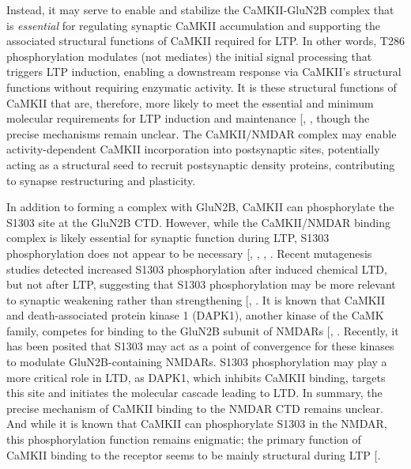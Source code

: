 \documentclass[
  11pt,
  letterpaper,
]{scrreprt}
\begin{document}
Instead, it may serve to enable and stabilize the CaMKII-GluN2B complex
that is \emph{essential} for regulating synaptic CaMKII accumulation and
supporting the associated structural functions of CaMKII required for
LTP. In other words, T286 phosphorylation modulates (not mediates) the
initial signal processing that triggers LTP induction, enabling a
downstream response via CaMKII's structural functions without requiring
enzymatic activity. It is these structural functions of CaMKII that are,
therefore, more likely to meet the essential and minimum molecular
requirements for LTP induction and maintenance
{[},
\citeproc{ref-kim2016Interplay}{220}{]}, though the precise mechanisms
remain unclear. The CaMKII/NMDAR complex may enable activity-dependent
CaMKII incorporation into postsynaptic sites, potentially acting as a
structural seed to recruit postsynaptic density proteins, contributing
to synapse restructuring and plasticity.

In addition to forming a complex with GluN2B, CaMKII can phosphorylate
the S1303 site at the GluN2B CTD. However, while the CaMKII/NMDAR
binding complex is likely essential for synaptic function during LTP,
S1303 phosphorylation does not appear to be necessary
{[},
,
,
\citeproc{ref-tullis2021GluN2B}{223}{]}. Recent mutagenesis studies
detected increased S1303 phosphorylation after induced chemical LTD, but
not after LTP, suggesting that S1303 phosphorylation may be more
relevant to synaptic weakening rather than strengthening
{[},
\citeproc{ref-tullis2021GluN2B}{223}{]}. It is known that CaMKII and
death-associated protein kinase 1 (DAPK1), another kinase of the CaMK
family, competes for binding to the GluN2B subunit of NMDARs
{[},
\citeproc{ref-goodell2017DAPK1}{222}{]}. Recently, it has been posited
that S1303 may act as a point of convergence for these kinases to
modulate GluN2B-containing NMDARs. S1303 phosphorylation may play a more
critical role in LTD, as DAPK1, which inhibits CaMKII binding, targets
this site and initiates the molecular cascade leading to LTD. In
summary, the precise mechanism of CaMKII binding to the NMDAR CTD
remains unclear. And while it is known that CaMKII can phosphorylate
S1303 in the NMDAR, this phosphorylation function remains enigmatic; the
primary function of CaMKII binding to the receptor seems to be mainly
structural during LTP {[}\citeproc{ref-tullis2021GluN2B}{223}{]}.
\end{document}
